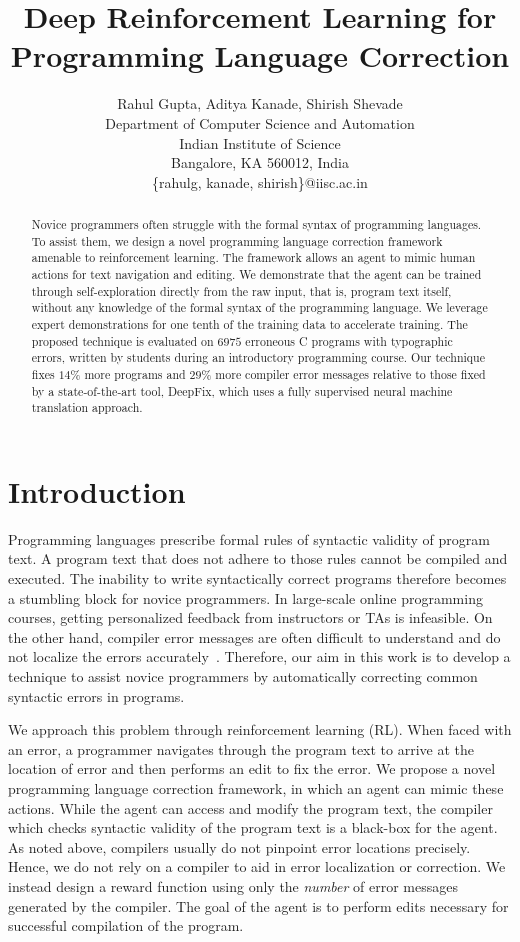 \documentclass{article}
\title{Deep Reinforcement Learning for Programming Language Correction}
\author{
	Rahul Gupta, 
	Aditya Kanade, 
	Shirish Shevade
	\\ 
	Department of Computer Science and Automation \\
    Indian Institute of Science \\
    Bangalore, KA 560012, India \\
\{rahulg,
	kanade,
	shirish\}@iisc.ac.in
}
\begin{document}
\maketitle

\begin{abstract}
Novice programmers often struggle with the formal syntax of
programming languages.
To assist them, we design a novel programming language correction
framework amenable to reinforcement learning.
The framework allows an agent to mimic human actions for text
navigation and editing.
We demonstrate that the agent can be trained through self-exploration directly from the raw input,
that is, program text itself, without any knowledge of the formal
syntax of the programming language.
We leverage expert demonstrations for one tenth of the training data to accelerate training.
The proposed technique is evaluated on $6975$ erroneous C programs with
typographic errors, written by students during an introductory programming
course.
Our technique fixes $14\%$ more programs and $29\%$ more compiler error
messages relative to those fixed by a state-of-the-art tool, DeepFix,
which uses a fully supervised neural machine translation approach.
\end{abstract}

 \section{Introduction}
Programming languages prescribe formal rules of syntactic
validity of program text. A program text that does not adhere
to those rules cannot be compiled and executed. The inability
to write syntactically correct programs therefore becomes
a stumbling block for novice programmers. In large-scale online
programming courses, getting personalized feedback from instructors
or TAs is infeasible. On the other hand, compiler error
messages are often difficult to understand and do not localize
the errors accurately~\cite{Traver:2010:CEM:1863617.1945532}.
Therefore, our aim in this work is
to develop a technique to assist novice programmers by
automatically correcting common syntactic errors in programs.

We approach this problem through reinforcement learning (RL).
When faced with an error, a programmer navigates through
the program text to arrive at the location of error and then performs an edit 
to fix the error. We propose a novel {programming language correction} framework, in 
which an agent can mimic these actions. While the agent can access and modify the
program text, the compiler which checks syntactic validity of
the program text is a black-box for the agent. As noted above, compilers
usually do not pinpoint error locations precisely. Hence, we
do not rely on a compiler to aid in error localization or correction.
We instead design a reward function using only the \emph{number} of
error messages generated by the compiler. The goal of the agent 
is to perform edits necessary for successful compilation of the program.
\end{document}
